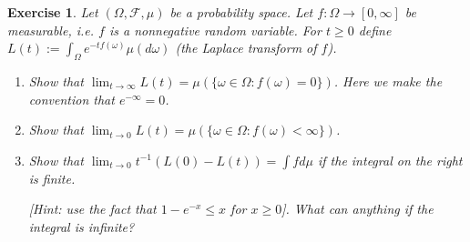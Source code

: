 \documentclass{article}
\newtheorem{exercise}[theorem]{Exercise}
\begin{document}
\begin{exercise}
Let \( (\Omega, \mathcal{F}, \mu) \) be a probability space. Let \( f : \Omega \to [0, \infty] \) be measurable, i.e. \( f \) is a nonnegative random variable. For \( t \geq 0 \) define \( L(t) := \int_{\Omega} e^{-tf(\omega)}\mu(d\omega) \) (the \textit{Laplace transform} of \( f \)).
    
    \begin{enumerate}
        \item[(a)] Show that \( \lim_{t \to \infty} L(t) = \mu(\{\omega \in \Omega : f(\omega) = 0\}) \). Here we make the convention that \( e^{-\infty} = 0 \).
        \item[(b)] Show that \( \lim_{t \to 0} L(t) = \mu(\{\omega \in \Omega : f(\omega) < \infty\}) \).
        \item[(c)] Show that \( \lim_{t \to 0} t^{-1} (L(0) - L(t)) = \int f d\mu \) if the integral on the right is finite. 
        
        \textit{[Hint: use the fact that \( 1 - e^{-x} \leq x \) for \( x \geq 0 \)]. What can anything if the integral is infinite?}
    \end{enumerate}
\end{exercise}
\end{document}
